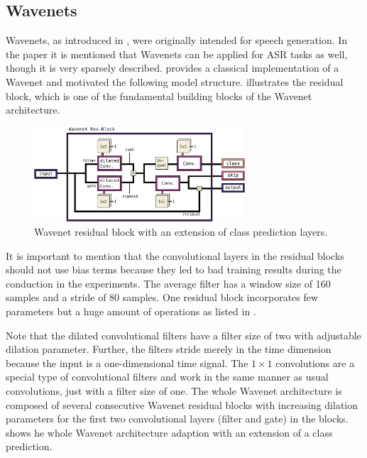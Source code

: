 \subsection{Wavenets}\label{sec:nn_arch_wavenet}
Wavenets, as introduced in \cite{Oord2016}, were originally intended for speech generation.
In the paper it is mentioned that Wavenets can be applied for ASR tasks as well, though it is very sparsely described.
\cite{Herrmann2018} provides a classical implementation of a Wavenet and motivated the following model structure.
 illustrates the residual block, which is one of the fundamental building blocks of the Wavenet architecture.
\begin{figure}[!ht]
  \centering
    \includegraphics[width=0.7\textwidth]{./4_nn/figs/nn_arch_wavenet_block.pdf}
  \caption{Wavenet residual block \cite{Oord2016} with an extension of class prediction layers.}
  \label{fig:nn_arch_wavenet_block}
\end{figure}
\FloatBarrier
\noindent
It is important to mention that the convolutional layers in the residual blocks should not use bias terms because they led to bad training results during the conduction in the experiments.
The average filter has a window size of 160 samples and a stride of 80 samples.
One residual block incorporates few parameters but a huge amount of operations as listed in .

Note that the dilated convolutional filters have a filter size of two with adjustable dilation parameter.
Further, the filters stride merely in the time dimension because the input is a one-dimensional time signal.
The $1 \times 1$ convolutions are a special type of convolutional filters and work in the same manner as usual convolutions, just with a filter size of one.
The whole Wavenet architecture is composed of several consecutive Wavenet residual blocks with increasing dilation parameters for the first two convolutional layers (filter and gate) in the blocks.
 shows he whole Wavenet architecture adaption with an extension of a class prediction.
